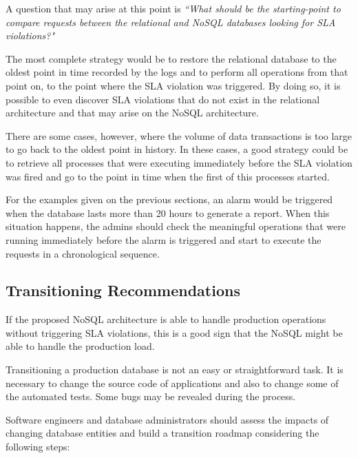 A question that may arise at this point is \textit{``What should be the starting-point to compare requests between the relational and NoSQL databases looking for SLA violations?"}

The most complete strategy would be to restore the relational database to the oldest point in time recorded by the logs and to perform all operations from that point on, to the point where the SLA violation was triggered. By doing so, it is possible to even discover SLA violations that do not exist in the relational architecture and that may arise on the NoSQL architecture.

There are some cases, however, where the volume of data transactions is too large to go back to the oldest point in history. In these cases, a good strategy could be to retrieve all processes that were executing immediately before the SLA violation was fired and go to the point in time when the first of this processes started. 

For the examples given on the previous sections, an alarm would be triggered when the database lasts more than 20 hours to generate a report. When this situation happens, the admins should check the meaningful operations that were running immediately before the alarm is triggered and start to execute the requests in a chronological sequence. 

\subsection{Transitioning Recommendations}
\label{transitioning-recommendations}
If the proposed NoSQL architecture is able to handle production operations without triggering SLA violations, this is a good sign that the NoSQL might be able to handle the production load.

Transitioning a production database is not an easy or straightforward task. It is necessary to change the source code of applications and also to change some of the automated tests. Some bugs may be revealed during the process. 

Software engineers and database administrators should assess the impacts of changing database entities and build a transition roadmap considering the following steps:

